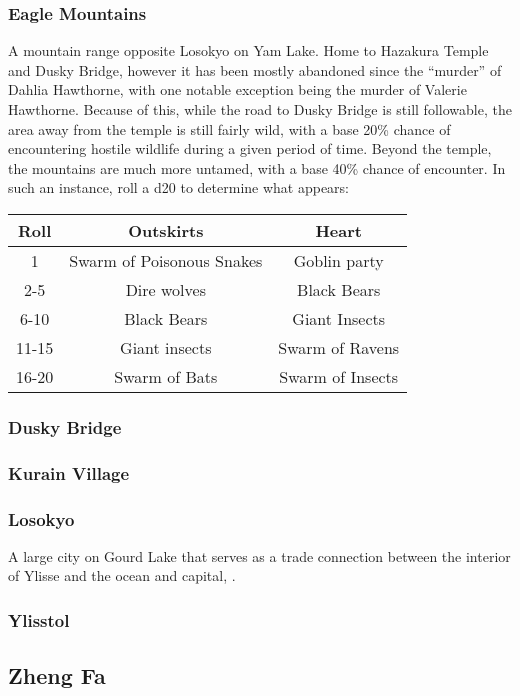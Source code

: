 \subsubsection{Eagle Mountains}
\label{places:eaglemountains}
A mountain range opposite Losokyo on Yam Lake. Home to Hazakura Temple and Dusky Bridge, however it has been mostly abandoned since the ``murder'' of Dahlia Hawthorne, with one notable exception being the murder of Valerie Hawthorne. Because of this, while the road to Dusky Bridge is still followable, the area away from the temple is still fairly wild, with a base 20\% chance of encountering hostile wildlife during a given period of time. Beyond the temple, the mountains are much more untamed, with a base 40\% chance of encounter.  In such an instance, roll a d20 to determine what appears:\\
\begin{center}
\begin{tabular}{c c c}
Roll & Outskirts & Heart \\\hline
1 & Swarm of Poisonous Snakes  & Goblin party \\
2-5 & Dire wolves & Black Bears \\
6-10 & Black Bears & Giant Insects \\
11-15 & Giant insects & Swarm of Ravens \\
16-20 & Swarm of Bats  & Swarm of Insects \end{tabular}\end{center}

\subsubsection{Dusky Bridge}
\label{places:duskybridge}

\subsubsection{Kurain Village}
\label{places:kurain}

\subsubsection{Losokyo}
\label{places:losokyo}
A large city on Gourd Lake that serves as a trade connection between the interior of Ylisse and the ocean and capital, . 

\subsubsection{Ylisstol}
\label{places:ylisstol}

\subsection{Zheng Fa}
\label{nations:zhengfa}